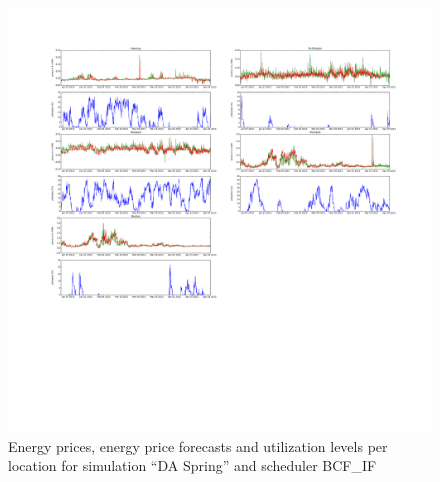 \begin{figure}[htbp]
	\centering
	\vspace*{-0.6in}
	\hspace*{-1.9in}
		\includegraphics[width=1.60\textwidth]{figures/appendix_simulation_results/DA_Spring_scenario_4.pdf}
	\vspace*{-2.8in}
	\caption{Energy prices, energy price forecasts and utilization levels per location for simulation ``DA Spring'' and scheduler BCF\_IF}
	\label{fig:app_DA_Spring_scenario_4}
\end{figure}

